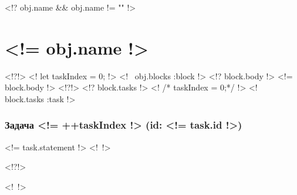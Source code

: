 \documentclass[<!= f.stringifyArr(f.documentClassOptions(pars)) !>]{article}
\begin{document}
    <!? obj.name && obj.name != "" !>
        \section*{<!= obj.name !>}
    <!?!>
    <! let taskIndex = 0; !>
    <!~ obj.blocks :block !>
        <!? block.body !>
            <!= block.body !>\nopagebreak
        <!?!>
        <!? block.tasks !>
            <! /* taskIndex = 0;*/ !>
            <!~ block.tasks :task !>
                \subsubsection*{Задача \textnumero <!= ++taskIndex !> (id: <!= task.id !>)}
                <!= task.statement !>
            <!~!>

        <!?!>
        
    <!~!>
\end{document}
